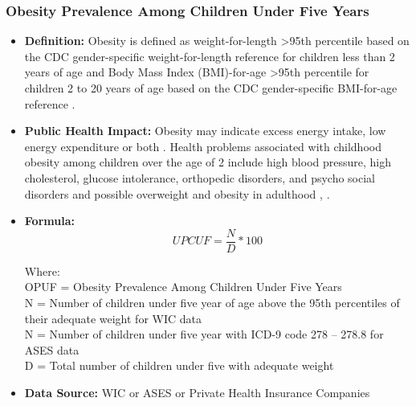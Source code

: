 \documentclass[12pt,letterpaper]{report}
\begin{document}
	\subsubsection{Obesity Prevalence Among Children Under Five Years} 
	\begin{itemize}
		\item \textbf{Definition:} Obesity is defined as weight-for-length >95th percentile based on the CDC gender-specific weight-for-length reference for children less than 2 years of age and Body Mass Index (BMI)-for-age >95th percentile for children 2 to 20 years of age based on the CDC gender-specific BMI-for-age reference \cite{mei1998increasing}.
		
		\item \textbf{Public Health Impact:} Obesity may indicate excess energy intake, low energy expenditure or both \cite{PedNSS}. Health problems associated with childhood obesity among children over the age of 2 include high blood pressure, high cholesterol, glucose intolerance, orthopedic disorders, and psycho social disorders and possible overweight and obesity in adulthood \cite{lobstein2004obesity}, \cite{weiss2004obesity}.
		
		\item \textbf{Formula:} 
			\begin{equation} 
		UPCUF = \frac{N}{D} *100	
			\end{equation} 

Where: \\
	OPUF = Obesity Prevalence Among Children Under Five Years\\
			
			N = Number of children under five year of age above the 95th percentiles of their adequate weight for WIC data\\
			N = Number of children under five year with ICD-9 code 278 – 278.8 for ASES data\\
			
			D = Total number of children under five with adequate weight\\
		
		\item \textbf{Data Source:} WIC or ASES or Private Health Insurance Companies
	\end{itemize}

\end{document}
